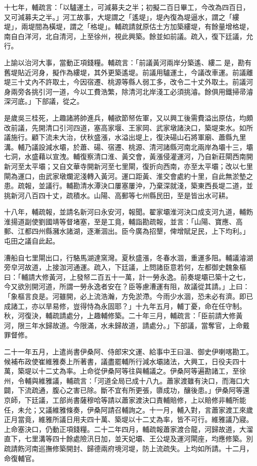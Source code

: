\begin{pinyinscope}
十七年，輔疏言：「以驢運土，可減募夫之半；初擬二百日畢工，今改為四百日，又可減募夫之半。」河工故事，大堤謂之「遙堤」，堤內復為堤逼水，謂之「縷堤」，兩堤間為橫堤，謂之「格堤」。輔疏請就原估土方加築縷堤，有餘量增格堤，南自白洋河，北自清河，上至徐州，視此興築。餘並如前議。疏入，復下廷議，允行。

上諭以治河大事，當動正項錢糧。輔疏言：「前議黃河兩岸分築遙、縷二是，勘有舊堤貼近河身，擬作為縷堤，其外更築遙堤。前議用驢運土，今議改車運。前議離堤三十丈內不許取土，今因宿遷、桃源等縣人弱工多，改令二十丈外取土。前議河身兩旁各挑引河一道，今以工費浩繁，除清河北岸淺工必須挑濬。餘俱用鐵掃帚濬深河底。」下部議，從之。

是歲吳三桂死，上趣諸將帥進兵，輔欲節帑佐軍，又以興工後需費溢出原估，均頗改前議，先開清口引河四道，塞高家堰、王家岡、武家墩諸決口，築堤束水。如所議施行。顧下流未大治，伏秋盛漲，水溢出堤上，復決碭山石將軍廟、蕭縣九里溝。輔乃議設減水壩，於蕭、碭、宿遷、桃源、清河諸縣河南北兩岸為壩十三，壩七洞，水盛藉以宣洩。輔復察清口淮、黃交會，黃漲侵灌運河，乃自新莊閘西南開新河至太平壩；又自文華寺開新河至七里閘，復折向西南，亦至太平壩；改以七里閘為運口，由武家墩爛泥淺轉入黃河。運口距黃、淮交會處約十里，自此無淤墊之患。疏報，並議行。輔勘清水潭決口屢塞屢沖，乃棄深就淺，築東西長堤二道，並挑新河八百四十丈，疏積水。山陽、高郵等七州縣民田，至是皆出水可耕。

十八年，輔疏報，並請名新河曰永安河，報聞。翟家壩淮河決口成支河九道，輔飭淮揚道副使劉國靖等督堵塞，至是工竟，輔詣勘疏報，並言：「山陽、寶應、高郵、江都四州縣瀦水諸湖，逐漸涸出。臣今廣為招墾，俾增賦足民，上下均利。」屯田之議自此起。

漕船自七里閘出口，行駱馬湖達窯灣。夏秋盛漲，冬春水涸，重運多阻。輔議濬湖旁皁河故道，上接泇河通運。疏入，下廷議，上問諸臣意若何，左都御史魏象樞曰：「輔請大修黃河，上發帑二百五十一萬，計一勞永逸。前奏堤壩已築十之七，今又欲別開河道，所謂一勞永逸者安在？臣等慮漕運有阻，故議從其請。」上曰：「象樞言良是。河雖開，必上流浩瀚，方免淤滯。今雨少水涸，恐未必有濟。即已成諸工，亦以旱易修，豈得恃為永固耶？」十九年五月，輔丁憂，命在任守制。秋，河復決，輔疏請處分，上趣輔修築。二十年三月，輔疏言：「臣前請大修黃河，限三年水歸故道。今限滿，水未歸故道，請處分。」下部議，當奪官，上命戴罪督修。

二十一年五月，上遣尚書伊桑阿、侍郎宋文運、給事中王曰溫、御史伊喇喀勘工。候補布政使崔維雅奏上所著書，議盡罷輔所行減水壩諸法，大興工，日役夫四十萬，築堤以十二丈為率。上命從伊桑阿等往與輔議之。伊桑阿等遍勘諸工，至徐州，令輔與維雅議，輔疏言：「河道全局已成十八九。蕭家渡雖有決口，而海口大闢，下流疏通，腹心之害已除。斷不宜有所更張，隳成功，釀後患。」伊桑阿等還京師，下廷議，工部尚書薩穆哈等請以蕭家渡決口責輔賠修，上以賠修非輔所能任，未允；又議維雅條奏，伊桑阿請召輔詢之。十一月，輔入對，言蕭家渡工來歲正月當竟，維雅所議日用夫四十萬、築堤以十二丈為率，皆不可行。維雅議乃寢。上命塞決口，仍動正項錢糧。二十二年四月，輔疏報蕭家渡合龍，河歸故道，大溜直下，七里溝等四十餘處險汛日加，並天妃壩、王公堤及運河閘座，均應修築。別疏請飭河南巡撫修築開封、歸德兩府境河堤，防上流疏失。上均如所請。十二月，命復輔官。


\end{pinyinscope}
